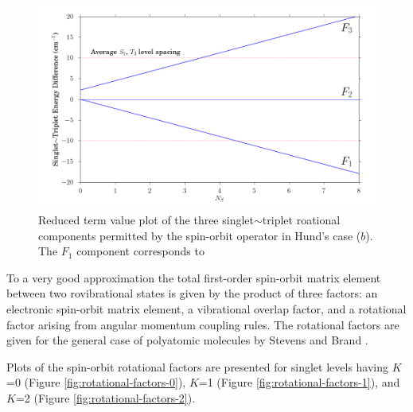 \documentclass[12pt,draft]{mitthesis}
\begin{document}
\begin{figure}
  \caption{ Reduced term value plot of the three singlet$\sim$triplet
    roational components permitted by the spin-orbit operator in
    Hund's case ($b$).  The $F_1$ component corresponds to  }
  \label{fig:components}
  \centering
  \includegraphics[width=6in]{f-components.png}
\end{figure}

To a very good approximation the total first-order spin-orbit matrix
element between two rovibrational states is given by the product of
three factors: an electronic spin-orbit matrix element, a vibrational
overlap factor, and a rotational factor arising from angular momentum
coupling rules.  The rotational factors are given for the general case
of polyatomic molecules by Stevens and Brand \cite{stevens73}.  

Plots of the spin-orbit rotational factors are presented for singlet
levels having $K$=0 (Figure \ref{fig:rotational-factors-0}), $K$=1
(Figure \ref{fig:rotational-factors-1}), and $K$=2 (Figure
\ref{fig:rotational-factors-2}).
\end{document}
